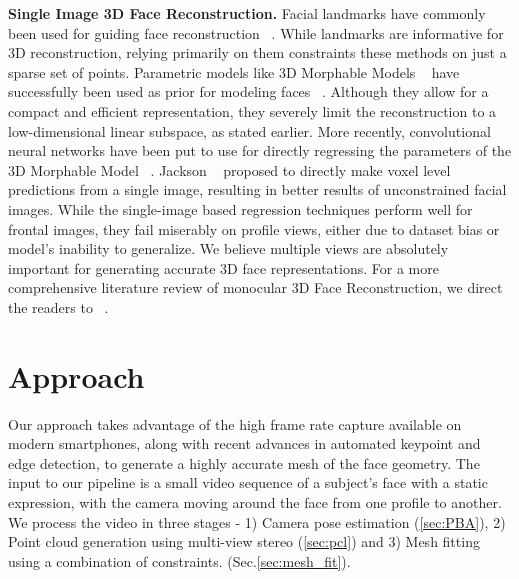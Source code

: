 \documentclass[10pt,twocolumn,letterpaper]{article}
\begin{document}
\noindent \textbf{Single Image 3D Face Reconstruction.} Facial landmarks have commonly been used for guiding face reconstruction ~\cite{zhu2015high, aldrian2010linear, kemelmacher20113d, dou2014robust}. While landmarks are informative for 3D reconstruction, relying primarily on them constraints these methods on just a sparse set of points. Parametric models like 3D Morphable Models ~\cite{blanz1999morphable} have successfully been used as prior for modeling faces ~\cite{blanz1999morphable, breuer2008automatic, zhu2015high, saito2017photorealistic, jiang20183d, richardson20163d, tuan2017regressing}. Although they allow for a compact and efficient representation, they severely limit the reconstruction to a low-dimensional linear subspace, as stated earlier. More recently, convolutional neural networks have been put to use for directly regressing the parameters of the 3D Morphable Model ~\cite{zhu2016face, jourabloo2016large, huber2016multiresolution}. Jackson \etal ~\cite{jackson2017large} proposed to directly make voxel level predictions from a single image, resulting in better results of unconstrained facial images. While the single-image based regression techniques perform well for frontal images, they fail miserably on profile views, either due to dataset bias or model's inability to generalize. We believe multiple views are absolutely important for generating accurate 3D face representations.  For a more comprehensive literature review of monocular 3D Face Reconstruction, we direct the readers to ~\cite{zollhofer2018state}.




\section{Approach}

Our approach takes advantage of the high frame rate capture available on modern smartphones, along with recent advances in automated keypoint and edge detection, to generate a highly accurate mesh of the face geometry. 
The input to our pipeline is a small video sequence of a subject's face with a static expression, with the camera moving around the face from one profile to another.
We process the video in three stages -  1) Camera pose estimation (\ref{sec:PBA}), 2) Point cloud generation using multi-view stereo (\ref{sec:pcl}) and 3) Mesh fitting using a combination of constraints. (Sec.\ref{sec:mesh_fit}). 
\end{document}
